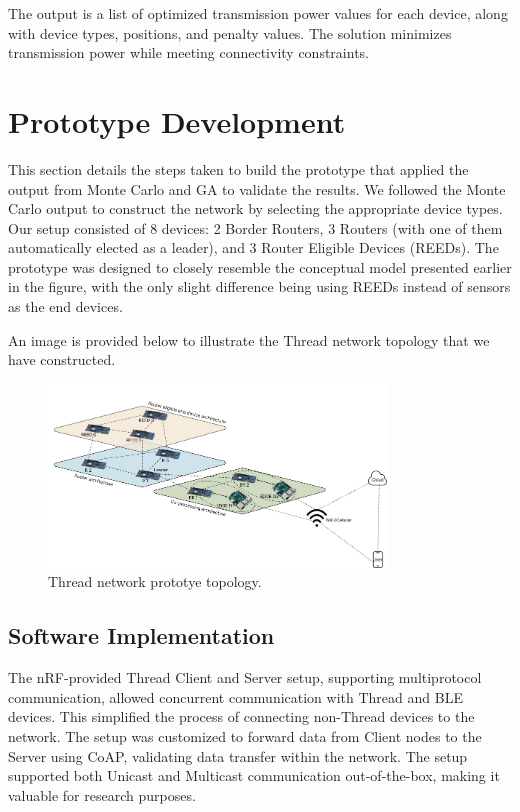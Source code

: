 The output is a list of optimized transmission power values for each device, along with device types, positions, and penalty values. The solution minimizes transmission power while meeting connectivity constraints.


\section{Prototype Development}\label{sec:prototype_development}
This section details the steps taken to build the prototype that applied the output from Monte Carlo and GA to validate the results. We followed the Monte Carlo output to construct the network by selecting the appropriate device types. Our setup consisted of 8 devices: 2 Border Routers, 3 Routers (with one of them automatically elected as a leader), and 3 Router Eligible Devices (REEDs). The prototype was designed to closely resemble the conceptual model presented earlier in the figure, with the only slight difference being using REEDs instead of sensors as the end devices.

An image is provided below to illustrate the Thread network topology that we have constructed.

\begin{figure}[H]
    \centering
    \includegraphics[width=0.8\textwidth]{images/research_design/prototype_topology.png}
    \caption{Thread network prototye topology.}
    \label{fig:prototype_topology}
\end{figure}

\subsection{Software Implementation}\label{sec:software_implementation}
The nRF-provided Thread Client and Server setup, supporting multiprotocol communication, allowed concurrent communication with Thread and BLE devices. This simplified the process of connecting non-Thread devices to the network. The setup was customized to forward data from Client nodes to the Server using CoAP, validating data transfer within the network. The setup supported both Unicast and Multicast communication out-of-the-box, making it valuable for research purposes.

